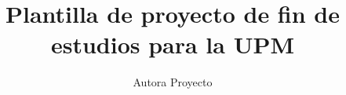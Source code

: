 \documentclass[%
    school=etsisi,%
    type=pfg,%
    degree=61TI,%
    authorsex=f,%
    directorsex=f,%
]{upm-report}
\author{Autora Proyecto}
\title{Plantilla de proyecto de fin de estudios para la UPM}
\begin{document}


\frontmatter

\tableofcontents
\listoffigures
\listoftables
\lstlistoflistings

\mainmatter








\appendix





\backmatter

\printbibliography
\printglossaries
\printindex
\end{document}
